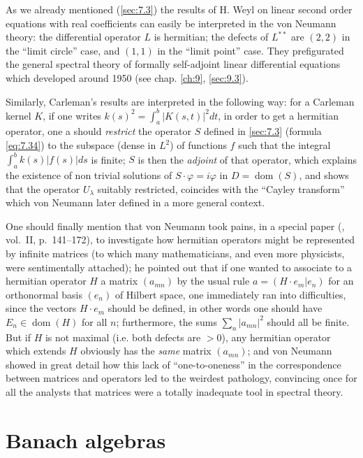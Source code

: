 \documentclass[12pt,a4paper,leqno,twoside]{extbook}
\newcommand{\dom}{\operatorname{dom}}
\begin{document}
As we already mentioned (\ref{sec:7.3}) the results of H. Weyl on linear second order equations with real coefficients can easily be interpreted in the von Neumann theory: the differential operator \(L\) is hermitian; the defects of \(L^{**}\) are \((2,2)\) in the ``limit circle'' case, and \((1,1)\) in the ``limit point'' case. They prefigurated the general spectral theory of formally self-adjoint linear differential equations which developed around 1950 (see chap. \ref{ch:9}, \ref{sec:9.3}).

Similarly, Carleman's results are interpreted in the following way: for a Carleman kernel \(K\), if one writes \(k(s)^2 = \int_a^b |K(s,t)|^2 dt\), in order to get a hermitian operator, one a should \emph{restrict} the operator \(S\) defined in \ref{sec:7.3} (formula \eqref{eq:7.34}) to the subspace (dense in \(L^2\)) of functions \(f\) such that the integral \(\int_a^b k(s)|f(s)|ds\) is finite; \(S\) is then the \emph{adjoint} of that operator, which explains the existence of non trivial solutions of \(S \cdot \varphi = i \varphi\) in \(D = \dom(S)\), and shows that the operator \(U_\lambda\) suitably restricted, coincides with the ``Cayley transform'' which von Neumann later defined in a more general context.

One should finally mention that von Neumann took pains, in a special paper (\cite{221}, vol.~II, p.~141--172), to investigate how hermitian operators might be represented by infinite matrices (to which many mathematicians, and even more physicists, were sentimentally attached); he pointed out that if one wanted to associate to a hermitian operator \(H\) a matrix \((a_{mn})\) by the usual rule \(a = (H \cdot e_m | e_n)\) for an orthonormal basis \((e_n)\) of Hilbert space, one immediately ran into difficulties, since the vectors \(H \cdot e_m\) should be defined, in other words one should have \(E_n \in \dom(H)\) for all \(n\); furthermore, the sums \(\sum\limits_n |a_{mn}|^2\) should all be finite. But if \(H\) is not maximal (i.e. both defects are \(>0\)), any hermitian operator which extends \(H\) obviously has the \emph{same} matrix \((a_{mn})\); and von Neumann showed in great detail how this lack of ``one-to-oneness'' in the correspondence between matrices and operators led to the weirdest pathology, convincing once for all the analysts that matrices were a totally inadequate tool in spectral theory.

\section{Banach algebras}
\label{sec:7.5}
\end{document}

